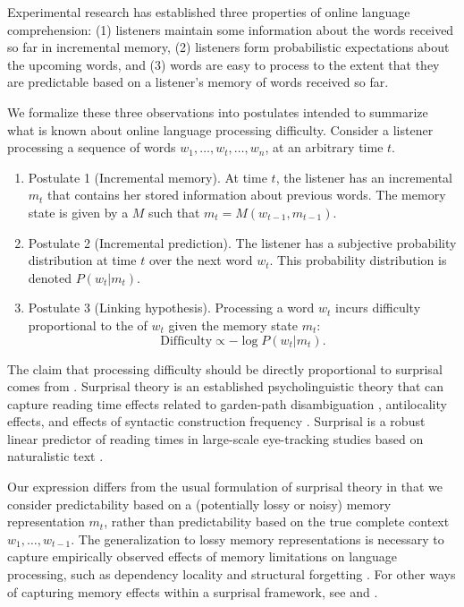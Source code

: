 Experimental research has established three properties of online language comprehension: (1) listeners maintain some information about the words received so far in incremental memory, (2) listeners form probabilistic expectations about the upcoming words, and (3) words are easy to process to the extent that they are predictable based on a listener's memory of words received so far.

We formalize these three observations into postulates intended to summarize what is known about online language processing difficulty. Consider a listener processing a sequence of words $w_1, \dots, w_t, \dots, w_n$, at an arbitrary time $t$.
\begin{enumerate}
    \item Postulate 1 (Incremental memory). At time $t$, the listener has an incremental  $m_t$ that contains her stored information about previous words. The memory state is given by a  $M$ such that $m_t = M(w_{t-1}, m_{t-1})$.
    \item Postulate 2 (Incremental prediction). The listener has a subjective probability distribution at time $t$ over the next word $w_t$. This probability distribution is denoted $P(w_t|m_t)$.
    \item Postulate 3 (Linking hypothesis). Processing a word $w_t$ incurs difficulty proportional to the  of $w_t$ given the memory state $m_t$:
    \begin{equation}
    \label{eq:lossy-surp}
    \text{Difficulty} \propto -\log P(w_t | m_t).
\end{equation}
\end{enumerate}
The claim that processing difficulty should be directly proportional to surprisal comes from . Surprisal theory is an established psycholinguistic theory that can capture reading time effects related to garden-path disambiguation \citep{hale2001probabilistic}, antilocality effects, and effects of syntactic construction frequency \citep{levy2008expectation}. Surprisal is a robust linear predictor of reading times in large-scale eye-tracking studies based on naturalistic text \citep{smith-effect-2013,goodkind-predictive-2018}.

Our expression differs from the usual formulation of surprisal theory in that we consider predictability based on a (potentially lossy or noisy) memory representation $m_t$, rather than predictability based on the true complete context $w_1, \dots, w_{t-1}$. The generalization to lossy memory representations is necessary to capture empirically observed effects of memory limitations on language processing, such as dependency locality and structural forgetting \citep{futrell-noisy-context-2017,futrell2019information}. For other ways of capturing memory effects within a surprisal framework, see \citet{demberg-incremental-2013} and \citet{rasmussen-2017-left}.

